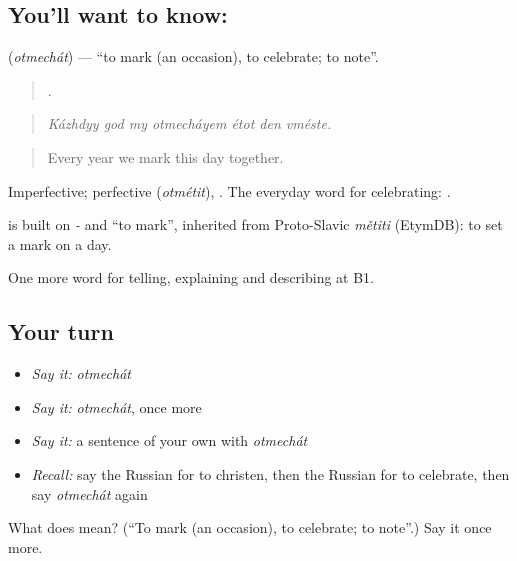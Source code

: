 \subsection*{You'll want to know: }
\textbf{} (\emph{otmechát}) — \textquotedblleft{}to mark (an occasion), to celebrate; to note\textquotedblright{}.

\begin{quote}
      .
\end{quote}

\begin{quote}
\emph{Kázhdyy god my otmecháyem étot den vméste.}
\end{quote}

\begin{quote}
Every year we mark this day together.
\end{quote}

Imperfective; perfective \emph{} (\emph{otmétit}), \emph{}. The everyday word for celebrating: \emph{  }.

\begin{cousinweb}
\emph{} is built on \emph{-} and \emph{} \textquotedblleft{}to mark\textquotedblright{}, inherited from Proto-Slavic \emph{mětiti} (EtymDB): to set a mark on a day.
\end{cousinweb}

\begin{grammarlens}[title={What you've built}]
One more word for telling, explaining and describing at B1.
\end{grammarlens}

\subsection*{Your turn}
\begin{itemize}
\raggedright
  \item \emph{Say it:} \emph{otmechát}
  \item \emph{Say it:} \emph{otmechát}, once more
  \item \emph{Say it:} a sentence of your own with \emph{otmechát}
  \item \emph{Recall:} say the Russian for to christen, then the Russian for to celebrate, then say \emph{otmechát} again
\end{itemize}

\begin{tcolorbox}[breakable,colback=teal!4,colframe=teal!35!black,title={Before you move on}]
What does  mean? (\textquotedblleft{}To mark (an occasion), to celebrate; to note\textquotedblright{}.) Say it once more.
\end{tcolorbox}
